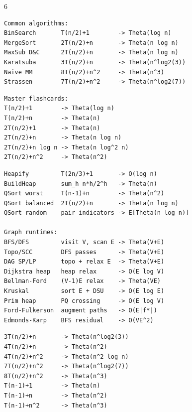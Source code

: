 \documentclass[a4paper,landscape]{article}
\begin{document}
\begin{multicols*}{6}
\begin{minipage}[t]{0.49\linewidth}\vspace{0pt}
\begin{lstlisting}[aboveskip=0pt,belowskip=0pt]
Common algorithms:
BinSearch       T(n/2)+1        -> Theta(log n)
MergeSort       2T(n/2)+n       -> Theta(n log n)
MaxSub D&C      2T(n/2)+n       -> Theta(n log n)
Karatsuba       3T(n/2)+n       -> Theta(n^log2(3))
Naive MM        8T(n/2)+n^2     -> Theta(n^3)
Strassen        7T(n/2)+n^2     -> Theta(n^log2(7))
\end{lstlisting}
\end{minipage}\hfill
\begin{minipage}[t]{0.40\linewidth}\vspace{0pt}
\begin{lstlisting}[aboveskip=0pt,belowskip=0pt]
Master flashcards:
T(n/2)+1        -> Theta(log n)
T(n/2)+n        -> Theta(n)
2T(n/2)+1       -> Theta(n)
2T(n/2)+n       -> Theta(n log n)
2T(n/2)+n log n -> Theta(n log^2 n)
2T(n/2)+n^2     -> Theta(n^2)
\end{lstlisting}
\end{minipage}

\begin{minipage}[t]{0.49\linewidth}\vspace{0pt}
\begin{lstlisting}[aboveskip=0pt,belowskip=0pt]
Heapify         T(2n/3)+1       -> O(log n)
BuildHeap       sum_h n*h/2^h   -> Theta(n)
QSort worst     T(n-1)+n        -> Theta(n^2)
QSort balanced  2T(n/2)+n       -> Theta(n log n)
QSort random    pair indicators -> E[Theta(n log n)]

Graph runtimes:
BFS/DFS         visit V, scan E -> Theta(V+E)
Topo/SCC        DFS passes      -> Theta(V+E)
DAG SP/LP       topo + relax E  -> Theta(V+E)
Dijkstra heap   heap relax      -> O(E log V)
Bellman-Ford    (V-1)E relax    -> Theta(VE)
Kruskal         sort E + DSU    -> O(E log E)
Prim heap       PQ crossing     -> O(E log V)
Ford-Fulkerson  augment paths   -> O(E|f*|)
Edmonds-Karp    BFS residual    -> O(VE^2)
\end{lstlisting}
\end{minipage}\hfill
\begin{minipage}[t]{0.40\linewidth}\vspace{0pt}
\begin{lstlisting}[aboveskip=0pt,belowskip=0pt]
3T(n/2)+n       -> Theta(n^log2(3))
4T(n/2)+n       -> Theta(n^2)
4T(n/2)+n^2     -> Theta(n^2 log n)
7T(n/2)+n^2     -> Theta(n^log2(7))
8T(n/2)+n^2     -> Theta(n^3)
T(n-1)+1        -> Theta(n)
T(n-1)+n        -> Theta(n^2)
T(n-1)+n^2      -> Theta(n^3)


\end{lstlisting}
\end{minipage}
\end{multicols*}
\end{document}
